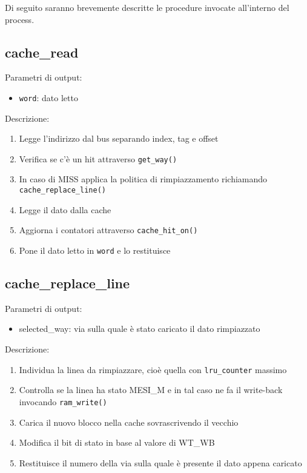 Di seguito saranno brevemente descritte le procedure invocate all'interno del process.


\subsection{cache\_read} %

Parametri di output:
\begin{itemize}
  \item \texttt{word}: dato letto
\end{itemize}


Descrizione:
\begin{enumerate}
  \item Legge l'indirizzo dal bus separando index, tag e offset
  \item Verifica se c'\`e un hit attraverso \texttt{get\_way()}
  \item In caso di MISS applica la politica di rimpiazzamento richiamando \texttt{cache\_replace\_line()}
  \item Legge il dato dalla cache
  \item Aggiorna i contatori attraverso \texttt{cache\_hit\_on()}
  \item Pone il dato letto in \texttt{word} e lo restituisce 
\end{enumerate}	

\subsection{cache\_replace\_line} %

Parametri di output:
\begin{itemize}
  \item selected\_way: via sulla quale \`e stato caricato il dato rimpiazzato
\end{itemize}

Descrizione:
\begin{enumerate}
  \item Individua la linea da rimpiazzare, cio\`e quella con \texttt{lru\_counter} massimo
  \item Controlla se la linea ha stato MESI\_M e in tal caso ne fa il write-back invocando \texttt{ram\_write()}
  \item Carica il nuovo blocco nella cache sovrascrivendo il vecchio
  \item Modifica il bit di stato in base al valore di WT\_WB
  \item Restituisce il numero della via sulla quale \`e presente il dato appena caricato
\end{enumerate}
		

